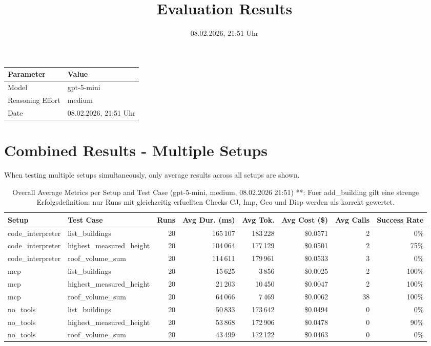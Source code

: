 \documentclass[a4paper,11pt]{article}
\title{Evaluation Results}
\date{08.02.2026, 21:51 Uhr}
\begin{document}
\maketitle

\begin{table}[H]
\centering
\begin{tabular}{l l}
\toprule
\textbf{Parameter} & \textbf{Value} \\
\midrule
Model & gpt-5-mini \\
Reasoning Effort & medium \\
Date & 08.02.2026, 21:51 Uhr \\
\bottomrule
\end{tabular}
\end{table}

\tableofcontents
\clearpage

\section{Combined Results - Multiple Setups}

When testing multiple setups simultaneously, only average results across all setups are shown.

\begin{table}[H]
\centering
\scriptsize
\caption{Overall Average Metrics per Setup and Test Case (gpt-5-mini, medium, 08.02.2026 21:51) **: Fuer add\_building gilt eine strenge Erfolgsdefinition: nur Runs mit gleichzeitig erfuellten Checks CJ, Imp, Geo und Disp werden als korrekt gewertet.}
\begin{tabular}{l l r r r r r r}
\toprule
Setup & Test Case & Runs & Avg Dur. (ms) & Avg Tok. & Avg Cost (\$) & Avg Calls & Success Rate \\
\midrule
code\_interpreter & list\_buildings & 20 & 165\,107 & 183\,228 & \$0.0571 & 2 & 0\% \\
code\_interpreter & highest\_measured\_height & 20 & 104\,064 & 177\,129 & \$0.0501 & 2 & 75\% \\
code\_interpreter & roof\_volume\_sum & 20 & 114\,611 & 179\,961 & \$0.0533 & 3 & 0\% \\
\midrule
mcp & list\_buildings & 20 & 15\,625 & 3\,856 & \$0.0025 & 2 & 100\% \\
mcp & highest\_measured\_height & 20 & 21\,203 & 10\,450 & \$0.0047 & 2 & 100\% \\
mcp & roof\_volume\_sum & 20 & 64\,066 & 7\,469 & \$0.0062 & 38 & 100\% \\
\midrule
no\_tools & list\_buildings & 20 & 50\,833 & 173\,642 & \$0.0494 & 0 & 0\% \\
no\_tools & highest\_measured\_height & 20 & 53\,868 & 172\,906 & \$0.0478 & 0 & 90\% \\
no\_tools & roof\_volume\_sum & 20 & 43\,499 & 172\,122 & \$0.0463 & 0 & 0\% \\
\bottomrule
\end{tabular}
\end{table}
\end{document}
